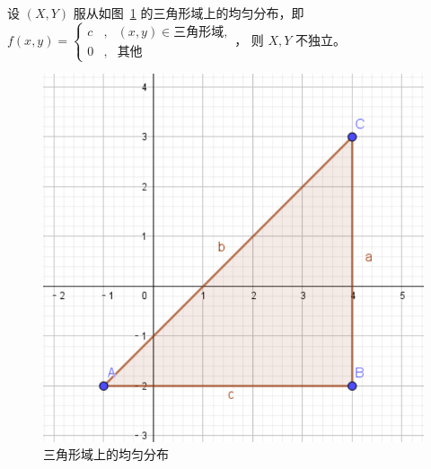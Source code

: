 \documentclass[../main.tex]{subfiles}
\begin{document}
\begin{example}
设 $(X,Y)$ 服从如图~\ref{fig:3.6.1} 的三角形域上的均匀分布，即 $
f(x,y)=\left\{
\begin{aligned}
c & , & (x,y)\in\text{三角形域},\\
0 & , & \text{其他}
\end{aligned}
\right.
$，
则 $X,Y$ 不独立。

\begin{figure}[!h]
    \centering
    \includegraphics[scale=0.4]{figures/triangle.pdf}
    \caption{三角形域上的均匀分布}
    \label{fig:3.6.1}
\end{figure}

\end{example}
\end{document}
